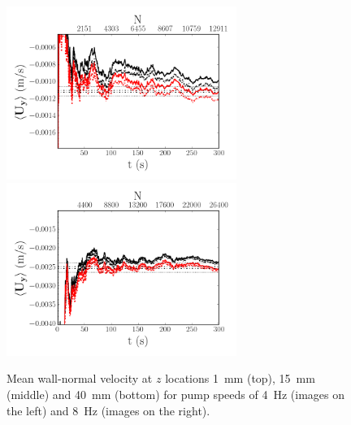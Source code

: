 \documentclass[12pt,oneside,a4paper]{article}
\begin{document}
\begin{figure}
\includegraphics[width=7.5cm]{images/LDA_timeDependenceImages/4hz_x_400_z_40_MeanUy.png}\hfill
\includegraphics[width=7.5cm]{images/LDA_timeDependenceImages/8hz_x_400_z_40_MeanUy.png}\\
\caption{Mean wall-normal velocity at $z$ locations \SI{1}{mm} (top), \SI{15}{mm} (middle) and \SI{40}{mm} (bottom) for pump speeds of \SI{4}{Hz} (images on the left) and \SI{8}{Hz} (images on the right).}
\label{figure:experiments:timeDependence:meanUy}
\end{figure}
\end{document}
